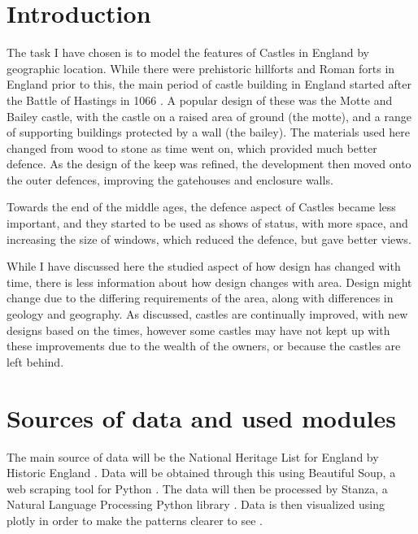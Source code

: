 \documentclass[12pt]{article}
\begin{document}
\maketitle

\section{Introduction}

The task I have chosen is to model the features of Castles in England by geographic location. While there were prehistoric hillforts and Roman forts in England prior to this, the main period of castle building in England started after the Battle of Hastings in 1066 \cite{RichardHodges1988OotE}. A popular design of these was the Motte and Bailey castle, with the castle on a raised area of ground (the motte), and a range of supporting buildings protected by a wall (the bailey). The materials used here changed from wood to stone as time went on, which provided much better defence. As the design of the keep was refined, the development then moved onto the outer defences, improving the gatehouses and enclosure walls.

Towards the end of the middle ages, the defence aspect of Castles became less important, and they started to be used as shows of status, with more space, and increasing the size of windows, which reduced the defence, but gave better views.

While I have discussed here the studied aspect of how design has changed with time, there is less information about how design changes with area. Design might change due to the differing requirements of the area, along with differences in geology and geography. As discussed, castles are continually improved, with new designs based on the times, however some castles may have not kept up with these improvements due to the wealth of the owners, or because the castles are left behind.


\section{Sources of data and used modules}

The main source of data will be the National Heritage List for England by Historic England \cite{nhle}. Data will be obtained through this using Beautiful Soup, a web scraping tool for Python \cite{bs}. The data will then be processed by Stanza, a Natural Language Processing Python library \cite{qi2020stanza}. Data is then visualized using plotly in order to make the patterns clearer to see \cite{plotly}.
\end{document}
